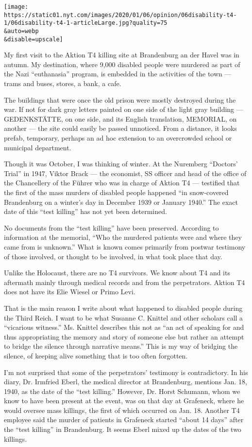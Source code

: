\texttt{[image: https://static01.nyt.com/images/2020/01/06/opinion/06disability-t4-1/06disability-t4-1-articleLarge.jpg?quality=75\\\&auto=webp\\\&disable=upscale]}

My first visit to the Aktion T4 killing site at Brandenburg an der Havel
was in autumn. My destination, where 9,000 disabled people were murdered
as part of the Nazi ``euthanasia'' program, is embedded in the
activities of the town --- trams and buses, stores, a bank, a cafe.

The buildings that were once the old prison were mostly destroyed during
the war. If not for dark gray letters painted on one side of the light
gray building --- GEDENKSTÄTTE, on one side, and its English
translation, MEMORIAL, on another --- the site could easily be passed
unnoticed. From a distance, it looks prefab, temporary, perhaps an ad
hoc extension to an overcrowded school or municipal department.

Though it was October, I was thinking of winter. At the Nuremberg
``Doctors' Trial'' in 1947, Viktor Brack --- the economist, SS officer
and head of the office of the Chancellery of the Führer who was in
charge of Aktion T4 --- testified that the first of the mass murders of
disabled people happened ``in snow-covered Brandenburg on a winter's day
in December 1939 or January 1940.'' The exact date of this ``test
killing'' has not yet been determined.

No documents from the ``test killing'' have been preserved. According to
information at the memorial, ``Who the murdered patients were and where
they came from is unknown.'' What is known comes primarily from postwar
testimony of those involved, or thought to be involved, in what took
place that day.

Unlike the Holocaust, there are no T4 survivors. We know about T4 and
its aftermath mainly through medical records and from the perpetrators.
Aktion T4 does not have its Elie Wiesel or Primo Levi.

That is the main reason I write about what happened to disabled people
during the Third Reich. I want to be what Susanne C. Knittel and other
scholars call a ``vicarious witness.'' Ms. Knittel describes this not as
``an act of speaking for and thus appropriating the memory and story of
someone else but rather an attempt to bridge the silence through
narrative means.'' This is my way of bridging the silence, of keeping
alive something that is too often forgotten.

I'm not surprised that some of the perpetrators' testimony is
contradictory. In his diary, Dr. Irmfried Eberl, the medical director at
Brandenburg, mentions Jan. 18, 1940, as the date of the ``test
killing.'' However, Dr. Horst Schumann, whom we know to have been
present at the event, was on that day at Grafeneck, where he would
oversee mass killings, the first of which occurred on Jan. 18. Another
T4 employee said the murder of patients in Grafeneck started ``about 14
days'' after the ``test killing'' in Brandenburg. It seems Eberl mixed
up the dates of the two killings.

